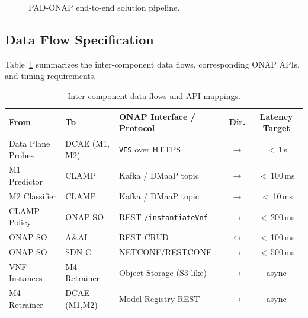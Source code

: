 \documentclass[12pt, a4paper]{article}
\begin{document}
\begin{figure}[h!]
\caption{PAD-ONAP end-to-end solution pipeline.}
\label{fig:pipeline}
\end{figure}

\subsection{Data Flow Specification}

Table~\ref{tab:dataflow} summarizes the inter-component data flows,
corresponding ONAP APIs, and timing requirements.

\begin{table}[h!]
\centering
\caption{Inter-component data flows and API mappings.}
\label{tab:dataflow}
\renewcommand{\arraystretch}{1.3}
\begin{tabular}{@{}lllcc@{}}
\toprule
\textbf{From} & \textbf{To} & \textbf{ONAP Interface / Protocol} & \textbf{Dir.} & \textbf{Latency Target} \\
\midrule
Data Plane Probes & DCAE (M1, M2) & \texttt{VES} over HTTPS & $\rightarrow$ & $<$\,1\,s \\
M1 Predictor      & CLAMP        & Kafka / DMaaP topic      & $\rightarrow$ & $<$\,100\,ms \\
M2 Classifier     & CLAMP        & Kafka / DMaaP topic      & $\rightarrow$ & $<$\,10\,ms \\
CLAMP Policy      & ONAP SO      & REST \texttt{/instantiateVnf} & $\rightarrow$ & $<$\,200\,ms \\
ONAP SO           & A\&AI        & REST CRUD                & $\leftrightarrow$ & $<$\,100\,ms \\
ONAP SO           & SDN-C        & NETCONF/RESTCONF         & $\rightarrow$ & $<$\,500\,ms \\
VNF Instances     & M4 Retrainer & Object Storage (S3-like) & $\rightarrow$ & async \\
M4 Retrainer      & DCAE (M1,M2) & Model Registry REST      & $\rightarrow$ & async \\
\bottomrule
\end{tabular}
\end{table}
\end{document}
